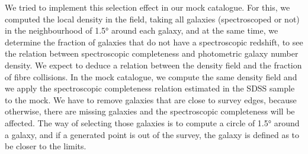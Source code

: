 We tried to implement this selection effect in our mock catalogue. For this, we
computed the local density in the field, taking all galaxies (spectroscoped or
not) in the neighbourhood of 1.5° around each galaxy, and at the same time, we
determine the fraction of galaxies that do not have a spectroscopic redshift,
to see the relation between spectroscopic completeness and photometric galaxy
number density. We expect to deduce a relation between the density field and
the fraction of fibre collisions. In the mock catalogue, we compute the same
density field and we apply the spectroscopic completeness relation estimated in
the SDSS sample to the mock. We have to remove galaxies that are close to
survey edges, because otherwise, there are missing galaxies and the
spectroscopic completeness will be affected. The way of selecting those
galaxies is to compute a circle of 1.5° around a galaxy, and if a generated
point is out of the survey, the galaxy is defined as to be closer to the
limits.

